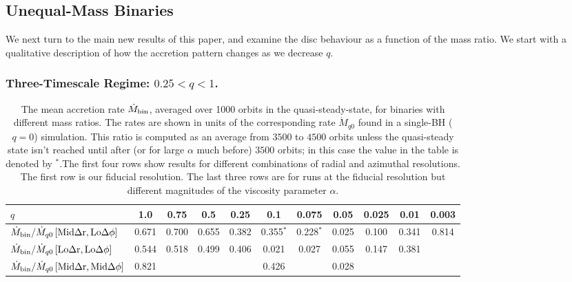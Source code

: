 \subsection{Unequal-Mass Binaries}
\label{Unequal-Mass Binaries}

We next turn to the main new results of this paper, and examine the
disc behaviour as a function of the mass ratio.  We start with a
qualitative description of how the accretion pattern changes as we
decrease $q$.

\subsubsection{Three-Timescale Regime: $0.25 < q < 1$.}
\label{Three Timescale Regime}


\begin{table}
\begin{center}
 \caption{The mean accretion rate $\dot{M}_{\rm bin}$, averaged over
    1000 orbits in the quasi-steady-state, for binaries with different
    mass ratios.  The rates are shown in units of the corresponding
    rate $\dot{M}_{q0}$ found in a single-BH ($q=0$) simulation.  
    This ratio is computed as an average from $3500$ to $4500$ orbits unless the quasi-steady 
    state isn't reached until after (or for large $\alpha$ much before) $3500$ orbits; in this case the value 
    in the table is denoted by $^*$.The first four rows show results for 
    different combinations of radial and azimuthal resolutions. 
    The first row is our fiducial resolution. The last three rows are for runs at the 
    fiducial resolution but different magnitudes of the viscosity parameter $\alpha$.}
\label{Mdot_ratios}
\begin{tabular}{l  |  c c c c c c c c c c}
                                     $q$                                   & 1.0   & 0.75 &  0.5 &  0.25   & 0.1   & 0.075  & 0.05 & 0.025 & 0.01 & 0.003 \\ \hline
    $\dot{M}_{\rm{bin}} / \dot{M}_{q0}  \left[\rm{Mid}\Delta r, \rm{Lo}\Delta \phi \right]$   & 0.671 &  0.700 & 0.655 & 0.382   & 0.355$^*$ & 0.228$^*$  & 0.025 & 0.100  & 0.341 &  0.814  \\                                   
  $\dot{M}_{\rm{bin}} / \dot{M}_{q0}  \left[\rm{Lo}\Delta r, \rm{Lo}\Delta \phi \right]$     & 0.544 & 0.518 & 0.499 & 0.406  & 0.021  & 0.027  & 0.055 & 0.147 & 0.381 &  \\  
  $\dot{M}_{\rm{bin}} / \dot{M}_{q0}  \left[\rm{Mid}\Delta r, \rm{Mid}\Delta \phi \right]$ & 0.821 &  &  &  &  0.426  &   & 0.028 & & &  \\

\end{tabular}
\end{center}
\end{table}

